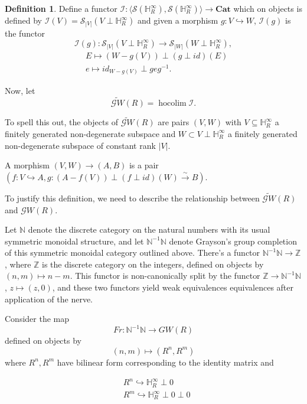 \documentclass[draftthesis,tocnosub,noragright,centerchapter,10pt]{uiucthesis2009}
\newcommand{\Z}{\mathbb Z}
\newcommand{\mbb}{\mathbb}
\newcommand{\mc}{\mathcal}
\newcommand{\Cat}{\mathbf{Cat}}
\DeclareMathOperator*{\hocolim}{hocolim}
\theoremstyle{plain}
\theoremstyle{definition}
\newtheorem{definition}[lemma]{Definition}
\begin{document}
\begin{definition}
Define a functor $\mc I : \langle
\mc S(\mbb H_R^\infty), \mc S(\mbb H_R^\infty) \rangle \rightarrow
\Cat$ which on objects is defined by $\mc I(V) = \mc S_{|V|}(V \perp
\mbb H_R^\infty)$ and given a morphism $g : V
\hookrightarrow W$, $\mc I(g)$ is the functor
\[
\mc I(g) : \mc S_{|V|}(V \perp
\mbb H_R^\infty) \rightarrow \mc S_{|W|}(W \perp
\mbb H_R^\infty),
\]
\begin{align*}
&E \mapsto (W - g(V)) \perp (g\perp id)(E)\\
&e \mapsto id_{W-g(V)} \perp geg^{-1}.
\end{align*}

Now, let 
\[
\widetilde{\mathscr GW}(R) = \hocolim \mc I.
\]

To spell this out, the objects of $\widetilde{\mathscr GW}(R)$ are pairs $(V,W)$ with $V
\subseteq \mbb H^\infty_R$ a finitely generated non-degenerate
subspace and $W \subset V \perp \mbb H^\infty_R$ a finitely generated
non-degenerate subspace of constant rank $|V|$.

A morphism $(V,W) \rightarrow (A,B)$ is a pair $(f : V \hookrightarrow
A,
g  : (A-f(V))\perp (f\perp id)(W) \xrightarrow{\sim} B)$.
\end{definition}

To justify this definition, we need to describe the relationship
between $\widetilde{\mathscr GW}(R)$ and $\mathscr GW(R)$.

Let $\mbb N$ denote the discrete category on the natural numbers with
its usual symmetric monoidal structure, and
let $\mbb N^{-1}\mbb N$ denote Grayson's group completion of this
symmetric monoidal category outlined above. There's a functor $\mbb
N^{-1}\mbb N \rightarrow \Z$, where $\Z$ is the discrete category on
the integers, defined on objects by $(n,m) \mapsto n-m$. This functor
is non-canonically split by the functor $\Z \rightarrow \mbb
N^{-1}\mbb N$, $z \mapsto (z,0)$, and these two functors yield weak equivalences
equivalences after application of the nerve. 

Consider the map 
\[
Fr: \mbb N^{-1}\mbb N  \rightarrow GW(R)
\]
defined on objects by
\[
(n,m) \mapsto (R^n,R^m)
\]
where $R^n,R^m$ have bilinear form corresponding to the identity
matrix and 

\begin{align*}
&R^n
\hookrightarrow \mbb H^\infty_R \perp 0\\ 
&R^m \hookrightarrow \mbb H^\infty_R \perp 0
\perp 0
\end{align*}
\end{document}
